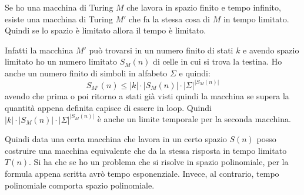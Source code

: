 \begin{teorema}
    Se ho una macchina di Turing $M$ che lavora in spazio finito e tempo infinito,
    esiste una macchina di Turing $M'$ che fa la stessa cosa di $M$ in tempo
    limitato. Quindi se lo spazio è limitato allora il tempo è limitato.
\end{teorema}
\begin{dimostrazione}
    Infatti la macchina $M'$ può trovarsi in un numero finito di stati $k$ e
    avendo spazio limitato ho un numero limitato $S_M(n)$ di celle in cui si trova
    la testina. Ho anche un numero finito di simboli in alfabeto $\Sigma$ e quindi:
    \begin{equation}
        S_{M'}(n) \leq |k| \cdot |S_M(n)| \cdot |\Sigma|^{|S_M(n)|}
    \end{equation}
    avendo che prima o poi ritorno a stati già visti quindi la macchina se supera
    la quantità appena definita capisce di essere in loop. Quindi
    $|k| \cdot |S_M(n)| \cdot |\Sigma|^{|S_M(n)|}$ è anche un limite temporale
    per la seconda macchina.
\end{dimostrazione}
Quindi data una certa macchina che lavora in un certo spazio $S(n)$ posso costruire
una macchina equivalente che da la stessa risposta in tempo limitato $T(n)$. Si ha
che se ho un problema che si risolve in spazio polinomiale, per la formula appena
scritta avrò tempo esponenziale. Invece, al contrario, tempo polinomiale comporta
spazio polinomiale.
